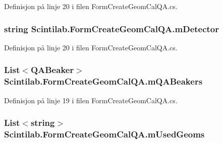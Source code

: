 Definisjon på linje 20 i filen Form\+Create\+Geom\+Cal\+Q\+A.\+cs.

\hypertarget{class_scintilab_1_1_form_create_geom_cal_q_a_a2990b98661b1e6bec61d6da32629944c}{
\subsubsection[{m\+Detector}]{\setlength{\rightskip}{0pt plus 5cm}string Scintilab.\+Form\+Create\+Geom\+Cal\+Q\+A.\+m\+Detector\hspace{0.3cm}{\ttfamily [private]}}}\label{class_scintilab_1_1_form_create_geom_cal_q_a_a2990b98661b1e6bec61d6da32629944c}


Definisjon på linje 20 i filen Form\+Create\+Geom\+Cal\+Q\+A.\+cs.

\hypertarget{class_scintilab_1_1_form_create_geom_cal_q_a_af6d0e7f88cf2381eee36d1c4c13106d5}{
\subsubsection[{m\+Q\+A\+Beakers}]{\setlength{\rightskip}{0pt plus 5cm}List$<${\bf Q\+A\+Beaker}$>$ Scintilab.\+Form\+Create\+Geom\+Cal\+Q\+A.\+m\+Q\+A\+Beakers\hspace{0.3cm}{\ttfamily [private]}}}\label{class_scintilab_1_1_form_create_geom_cal_q_a_af6d0e7f88cf2381eee36d1c4c13106d5}


Definisjon på linje 19 i filen Form\+Create\+Geom\+Cal\+Q\+A.\+cs.

\hypertarget{class_scintilab_1_1_form_create_geom_cal_q_a_a090638f16b85aa89acccb3418e478297}{
\subsubsection[{m\+Used\+Geoms}]{\setlength{\rightskip}{0pt plus 5cm}List$<$string$>$ Scintilab.\+Form\+Create\+Geom\+Cal\+Q\+A.\+m\+Used\+Geoms\hspace{0.3cm}{\ttfamily [private]}}}\label{class_scintilab_1_1_form_create_geom_cal_q_a_a090638f16b85aa89acccb3418e478297}


